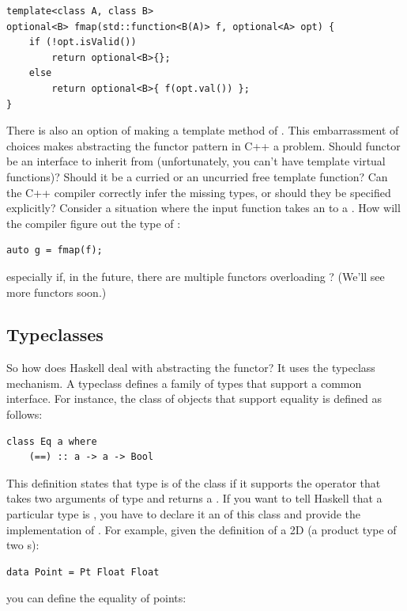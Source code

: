 \begin{Verbatim}[commandchars=\\\{\}]
template<class A, class B>
optional<B> fmap(std::function<B(A)> f, optional<A> opt) { 
    if (!opt.isValid())
        return optional<B>{};
    else 
        return optional<B>{ f(opt.val()) };
}
\end{Verbatim}
There is also an option of making  a template method of
. This embarrassment of choices makes abstracting the
functor pattern in C++ a problem. Should functor be an interface to
inherit from (unfortunately, you can't have template virtual functions)?
Should it be a curried or an uncurried free template function? Can the
C++ compiler correctly infer the missing types, or should they be
specified explicitly? Consider a situation where the input function
 takes an  to a . How will the
compiler figure out the type of :

\begin{Verbatim}[commandchars=\\\{\}]
auto g = fmap(f);
\end{Verbatim}
especially if, in the future, there are multiple functors overloading
? (We'll see more functors soon.)

\subsection{Typeclasses}\label{typeclasses}

So how does Haskell deal with abstracting the functor? It uses the
typeclass mechanism. A typeclass defines a family of types that support
a common interface. For instance, the class of objects that support
equality is defined as follows:

\begin{Verbatim}[commandchars=\\\{\}]
class Eq a where
    (==) :: a -> a -> Bool
\end{Verbatim}
This definition states that type  is of the class 
if it supports the operator \code{(==)} that takes two arguments of
type  and returns a . If you want to tell Haskell
that a particular type is , you have to declare it an
 of this class and provide the implementation of
\code{(==)}. For example, given the definition of a 2D 
(a product type of two s):

\begin{Verbatim}[commandchars=\\\{\}]
data Point = Pt Float Float
\end{Verbatim}
you can define the equality of points:

